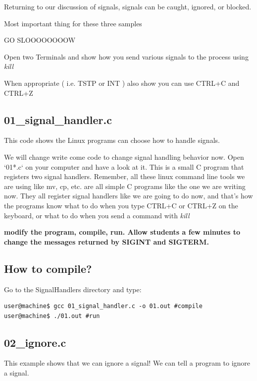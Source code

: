 \documentclass[12pt]{article}
\begin{document}
Returning to our discussion of signals, signals can be caught,  ignored, or blocked.

Most important thing for these three samples

{\LARGE GO SLOOOOOOOOW}

{\LARGE Open two Terminals and show how you send various signals to the process using \textit{kill}}

{\LARGE When appropriate ( i.e. TSTP or INT ) also show you can use CTRL+C and CTRL+Z}

\subsection{01\_signal\_handler.c}
This code shows the Linux programs can choose how to handle signals.

We will change write come code to change signal handling behavior now. Open `01*.c` on your computer and have a look at it. This is a small C program that registers two signal handlers. Remember, all these linux command line tools we are using like mv, cp, etc. are all simple C programs like the one we are writing now. They all register signal handlers like we are going to do now, and that's how the programs know what to do when you type CTRL+C or CTRL+Z on the keyboard, or what to do when you send a command with \textit{kill}

\begin{center}
\textbf{modify the program, compile, run. Allow students a few minutes to change the messages returned by SIGINT and SIGTERM. }
\end{center}


\subsection{How to compile?}
Go to the SignalHandlers directory and type:

\begin{lstlisting}
user@machine$ gcc 01_signal_handler.c -o 01.out #compile
user@machine$ ./01.out #run
\end{lstlisting}

\subsection{02\_ignore.c}
This example shows that we can ignore a signal! We can tell a program to ignore a signal. 
\end{document}
